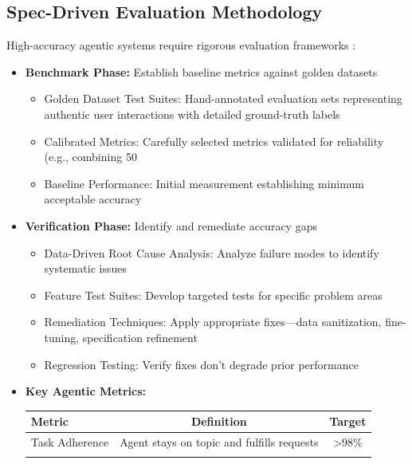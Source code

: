 \documentclass[11pt,a4paper]{article}
\begin{document}
\subsection{Spec-Driven Evaluation Methodology}
High-accuracy agentic systems require rigorous evaluation frameworks \cite{tableau2025}:
\begin{itemize}
\item \textbf{Benchmark Phase: }Establish baseline metrics against golden datasets
\begin{itemize}
    \item Golden Dataset Test Suites: Hand-annotated evaluation sets representing authentic user interactions with detailed ground-truth labels
    \item Calibrated Metrics: Carefully selected metrics validated for reliability (e.g., combining 50%
    \item Baseline Performance: Initial measurement establishing minimum acceptable accuracy
\end{itemize}
\item \textbf{Verification Phase: }Identify and remediate accuracy gaps\cite{tableau2025}
\begin{itemize}
    \item Data-Driven Root Cause Analysis: Analyze failure modes to identify systematic issues
    \item Feature Test Suites: Develop targeted tests for specific problem areas
    \item Remediation Techniques: Apply appropriate fixes—data sanitization, fine-tuning, specification refinement
    \item Regression Testing: Verify fixes don't degrade prior performance
\end{itemize}
\item \textbf{Key Agentic Metrics: }
\begin{table}[h] %
    \centering %
    \label{tab:example} %
    \begin{tabular}{lcc} %
        \toprule %
        Metric & Definition & Target \\
        \midrule %
        Task Adherence & Agent stays on topic and fulfills requests & >98\% \\
        \addlinespace %

\end{tabular}
\end{table}
\end{itemize}
\end{document}
